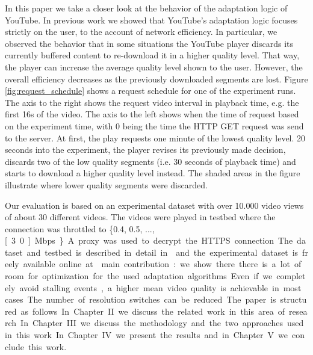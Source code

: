 In this paper we take a closer look at the behavior of the adaptation logic of YouTube.
In previous work we showed that YouTube's adaptation logic focuses strictly on the user, to the account of network efficiency.
In particular, we observed the behavior that in some situations the YouTube player discards its currently buffered content to re-download it in a higher quality level.
That way, the player can increase the average quality level shown to the user.
However, the overall efficiency decreases as the previously downloaded segments are lost.
Figure \ref{fig:request_schedule} shows a request schedule for one of the experiment runs.
The axis to the right shows the request video interval in playback time, e.g. the first 16s of the video.
The axis to the left shows when the time of request based on the experiment time, with 0 being the time the HTTP GET request was send to the server.
At first, the play requests one minute of the lowest quality level.
20 seconds into the experiment, the player revises its previously made decision, discards two of the low quality segments (i.e. 30 seconds of playback time) and starts to download a higher quality level instead.
The shaded areas in the figure illustrate where lower quality segments were discarded.

Our evaluation is based on an experimental dataset with over 10.000 video views of about 30 different videos.
The videos were played in testbed where the connection was throttled to \{0.4, 0.5, ..., \unit[3.0]{Mbps}\}.
A proxy was used to decrypt the HTTPS connection.
The dataset and testbed is described in detail in \cite{sieber16sacrificing,sieber15costaggressive} and the experimental dataset is freely available online at \cite{traces}. 


main contribution: we show there there is a lot of room for optimization for the used adaptation algorithms. Even if we completely avoid stalling events, a higher mean video quality is achievable in most cases. The number of resolution switches can be reduced.

The paper is structured as follows. In Chapter II we discuss the related work in this area of research. 
In Chapter III we discuss the methodology and the two approaches used in this work.
In Chapter IV we present the results and in Chapter V we conclude this work.

